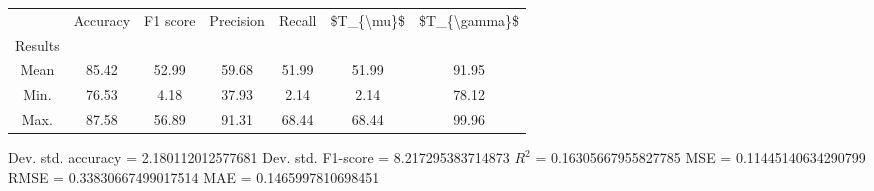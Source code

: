 \begin{tabular}{|c|c|c|c|c|c|c|}
\toprule
{} &  Accuracy &  F1 score &  Precision &  Recall &  \$T\_\{\textbackslash mu\}\$ &  \$T\_\{\textbackslash gamma\}\$ \\
Results &           &           &            &         &            &               \\
\hline
Mean    &     85.42 &     52.99 &      59.68 &   51.99 &      51.99 &         91.95 \\
Min.    &     76.53 &      4.18 &      37.93 &    2.14 &       2.14 &         78.12 \\
Max.    &     87.58 &     56.89 &      91.31 &   68.44 &      68.44 &         99.96 \\
\bottomrule
\end{tabular}

 Dev. std. accuracy = 2.180112012577681
 Dev. std. F1-score = 8.217295383714873
 $R^2$ = 0.16305667955827785
 MSE = 0.11445140634290799
 RMSE = 0.33830667499017514
 MAE = 0.1465997810698451